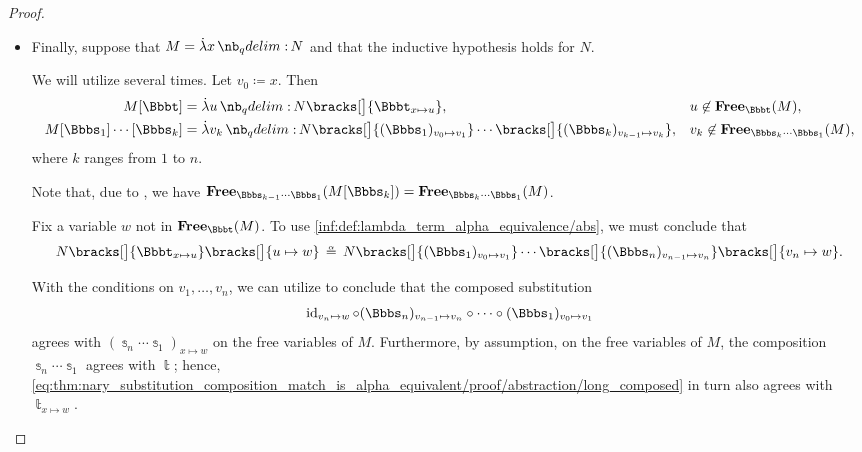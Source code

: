 \begin{proof}
\begin{itemize}
    \item Finally, suppose that \( M = \qabs x N \) and that the inductive hypothesis holds for \( N \).

    We will utilize  several times. Let \( v_0 \coloneqq x \). Then
    \begin{align*}
      M[\Bbbt]                    &= \qabs u N\bracks[\big]{ \Bbbt_{x \mapsto u} },                                                                     &&u \not\in \op*{Free}_\Bbbt(M), \\
      M[\Bbbs_1] \cdots [\Bbbs_k] &= \qabs {v_k} N\bracks[\big]{ (\Bbbs_1)_{v_0 \mapsto v_1} } \cdots \bracks[\big]{ (\Bbbs_k)_{v_{k-1} \mapsto v_k} }, &&v_k \not\in \op*{Free}_{\Bbbs_k \cdots \Bbbs_1}(M),
    \end{align*}
    where \( k \) ranges from \( 1 \) to \( n \).

    Note that, due to , we have \( \op*{Free}_{\Bbbs_{k-1} \cdots \Bbbs_1}(M[\Bbbs_k]) = \op*{Free}_{\Bbbs_k \cdots \Bbbs_1}(M) \).

    Fix a variable \( w \) not in \( \op*{Free}_\Bbbt(M) \). To use \ref{inf:def:lambda_term_alpha_equivalence/abs}, we must conclude that
    \begin{equation}\label{eq:thm:nary_substitution_composition_match_is_alpha_equivalent/proof/abstraction/goal}
      N\bracks[\big]{ \Bbbt_{x \mapsto u} }\bracks[\big]{ u \mapsto w } \aequiv N\bracks[\big]{ (\Bbbs_1)_{v_0 \mapsto v_1} } \cdots \bracks[\big]{ (\Bbbs_n)_{v_{n-1} \mapsto v_n} } \bracks[\big]{ v_n \mapsto w }.
    \end{equation}

    With the conditions on \( v_1, \ldots, v_n \), we can utilize  to conclude that the composed substitution
    \begin{equation}\label{eq:thm:nary_substitution_composition_match_is_alpha_equivalent/proof/abstraction/long_composed}
      \id_{v_n \mapsto w} \bincirc (\Bbbs_n)_{v_{n-1} \mapsto v_n} \bincirc \cdots \bincirc (\Bbbs_1)_{v_0 \mapsto v_1}
    \end{equation}
    agrees with \( (\Bbbs_n \cdots \Bbbs_1)_{x \mapsto w} \) on the free variables of \( M \). Furthermore, by assumption, on the free variables of \( M \), the composition \( \Bbbs_n \cdots \Bbbs_1 \) agrees with \( \Bbbt \); hence, \eqref{eq:thm:nary_substitution_composition_match_is_alpha_equivalent/proof/abstraction/long_composed} in turn also agrees with \( \Bbbt_{x \mapsto w} \).


\end{itemize}
\end{proof}
